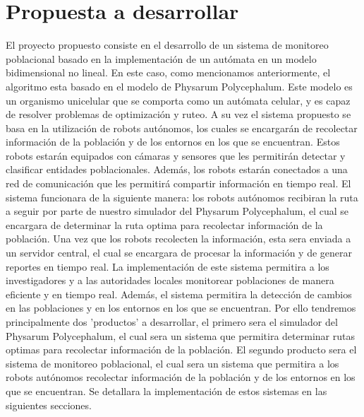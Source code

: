 \section{Propuesta a desarrollar}
\label{sec:Propuesta a desarrollar}
        El proyecto propuesto consiste en el desarrollo de un sistema de monitoreo poblacional basado en 
            la implementaci\'on de un aut\'omata en un modelo bidimensional no lineal. En este caso, 
            como mencionamos anteriormente, el algoritmo esta basado en el modelo de Physarum Polycephalum.
            Este modelo es un organismo unicelular que se comporta como un aut\'omata celular,
            y es capaz de resolver problemas de optimizaci\'on y ruteo.
        \vskip 0.5cm
        A su vez el sistema propuesto se basa en la utilizaci\'on de robots aut\'onomos, los cuales 
            se encargar\'an de recolectar informaci\'on de la poblaci\'on y de los entornos en los que 
            se encuentran. Estos robots estar\'an equipados con c\'amaras y sensores que les permitir\'an 
            detectar y clasificar entidades poblacionales. Adem\'as, los robots estar\'an conectados a 
            una red de comunicaci\'on que les permitir\'a compartir informaci\'on en tiempo real.
        \vskip 0.5cm
        El sistema funcionara de la siguiente manera: los robots aut\'onomos recibiran la ruta a seguir 
            por parte de nuestro simulador del Physarum Polycephalum, el cual se encargara de determinar
            la ruta optima para recolectar informaci\'on de la poblaci\'on. Una vez que los robots
            recolecten la informaci\'on, esta sera enviada a un servidor central, el cual se encargara
            de procesar la informaci\'on y de generar reportes en tiempo real.
        \vskip 0.5cm
        La implementaci\'on de este sistema permitira a los investigadores y a las autoridades locales
            monitorear poblaciones de manera eficiente y en tiempo real. Adem\'as, el sistema permitira
            la detecci\'on de cambios en las poblaciones y en los entornos en los que se encuentran.
        \vskip 0.5cm
        Por ello tendremos principalmente dos 'productos' a desarrollar, el primero sera el simulador
            del Physarum Polycephalum, el cual sera un sistema que permitira determinar rutas optimas
            para recolectar informaci\'on de la poblaci\'on. El segundo producto sera el sistema de 
            monitoreo poblacional, el cual sera un sistema que permitira a los robots aut\'onomos 
            recolectar informaci\'on de la poblaci\'on y de los entornos en los que se encuentran.
        \vskip 0.5cm
        Se detallara la implementaci\'on de estos sistemas en las siguientes secciones.
    